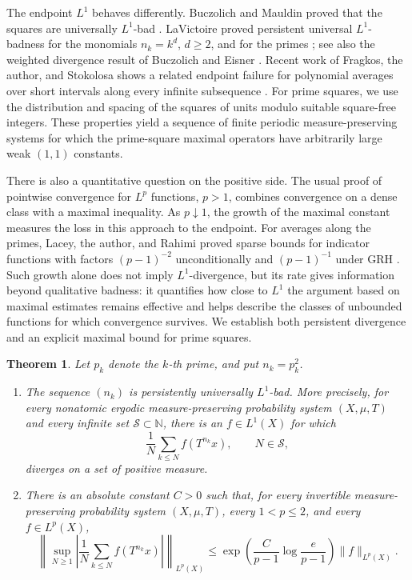 \documentclass[12pt,reqno]{amsart}
\numberwithin{equation}{section}
\newtheorem{theorem}[equation]{Theorem}
\theoremstyle{definition}
\theoremstyle{remark}
\begin{document}
The endpoint \(L^1\) behaves differently.
Buczolich and Mauldin proved that the squares are universally
\(L^1\)-bad \cite{BM10}.
LaVictoire proved persistent universal \(L^1\)-badness for the
monomials \(n_k=k^d\), \(d\geq2\), and for the primes
\cite{L09};
see also the weighted divergence result of Buczolich and Eisner
\cite{BuczolichEisner}.
Recent work of Fragkos, the author, and Stokolosa shows a related
endpoint failure for polynomial averages over short intervals
along every infinite subsequence
\cite{FragkosMousaviStokolosa}.
For prime squares, we use the distribution and spacing of the
squares of units modulo suitable square-free integers.
These properties yield a sequence of finite periodic
measure-preserving systems for which the prime-square maximal
operators have arbitrarily large weak \((1,1)\) constants.


There is also a quantitative question on the positive side.
The usual proof of pointwise convergence for \(L^p\) functions,
\(p>1\), combines convergence on a dense class with a maximal
inequality. As \(p\downarrow1\), the growth of the maximal
constant measures the loss in this approach to the endpoint.
For averages along the primes, Lacey, the author, and Rahimi
proved sparse bounds for indicator functions with factors
\((p-1)^{-2}\) unconditionally and \((p-1)^{-1}\) under GRH
\cite[Corollary~1.4]{LMR}.
Such growth alone does not imply \(L^1\)-divergence, but its rate
gives information beyond qualitative badness: it quantifies how
close to \(L^1\) the argument based on maximal estimates remains
effective and helps describe the classes of unbounded functions
for which convergence survives.
We establish both persistent divergence and an explicit maximal
bound for prime squares.


\begin{theorem}\label{t:pet}
Let \(p_k\) denote the \(k\)-th prime, and put \(n_k=p_k^2\).
\begin{enumerate}[label=\textup{(\roman*)}]
\item
The sequence \((n_k)\) is persistently universally \(L^1\)-bad.
More precisely, for every nonatomic ergodic measure-preserving
probability system \((X,\mu,T)\) and every infinite set
\(\mathcal S\subset\mathbb N\), there is an \(f\in L^1(X)\)
for which
\[
 \frac1N\sum_{k\leq N}f(T^{n_k}x),
 \qquad N\in\mathcal S,
\]
diverges on a set of positive measure.

\item
There is an absolute constant \(C>0\) such that, for every
invertible measure-preserving probability system \((X,\mu,T)\),
every \(1<p\leq2\), and every \(f\in L^p(X)\),
\[
 \left\|
 \sup_{N\geq1}
 \left|\frac1N\sum_{k\leq N}f(T^{n_k}x)\right|
 \right\|_{L^p(X)}
 \leq
 \exp\left(
 \frac{C}{p-1}\log\frac{e}{p-1}
 \right)
 \|f\|_{L^p(X)}.
\]
\end{enumerate}
\end{theorem}
\end{document}
